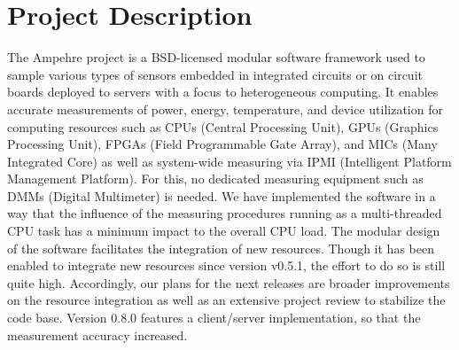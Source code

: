 %
%
%
%
%
%

\section{Project Description}
The Ampehre project is a BSD-licensed modular software framework used to sample various types of sensors embedded in integrated circuits or on circuit boards deployed to servers with a focus to heterogeneous computing. It enables accurate measurements of power, energy, temperature, and device utilization for computing resources such as CPUs (Central Processing Unit), GPUs (Graphics Processing Unit), FPGAs (Field Programmable Gate Array), and MICs (Many Integrated Core) as well as system-wide measuring via IPMI (Intelligent Platform Management Platform). For this, no dedicated measuring equipment such as DMMs (Digital Multimeter) is needed. We have implemented the software in a way that the influence of the measuring procedures running as a multi-threaded CPU task has a minimum impact to the overall CPU load. The modular design of the software facilitates the integration of new resources. Though it has been enabled to integrate new resources since version v0.5.1, the effort to do so is still quite high. Accordingly, our plans for the next releases are broader improvements on the resource integration as well as an extensive project review to stabilize the code base. Version 0.8.0 features a client/server implementation, so that the measurement accuracy increased. 
